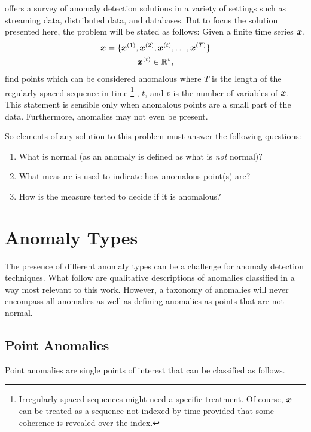 \cite{Gupta2013} offers a survey of anomaly detection solutions in a variety of settings such as streaming data, distributed data, and databases. But to focus the solution presented here, the problem will be stated as follows: Given a finite time series
 $\boldsymbol{x}$,
%
\begin{gather*}
\boldsymbol{x}=\{\boldsymbol{x}\sp{(1)},\boldsymbol{x}\sp{(2)},\boldsymbol{x}\sp{(t)},\ldots,\boldsymbol{x}\sp{(T)}\} \\
\boldsymbol{x}\sp{(t)} \in \mathbb{R}^v
,
\end{gather*}%
%
find points which can be considered anomalous where $T$ is the length of the regularly spaced sequence in time%
\footnote{Irregularly-spaced sequences might need a specific treatment. Of course, $\boldsymbol{x}$ can be treated as a sequence not indexed by time provided that some coherence is revealed over the index.}%
, $t$, and $v$ is the number of variables of $\boldsymbol{x}$. This statement is sensible only when anomalous points are a small part of the data. Furthermore, anomalies may not even be present.

So elements of any solution to this problem must answer the following questions:

\begin{enumerate}
\item
What is normal (as an anomaly is defined as what is \textit{not} normal)?
\item
What measure is used to indicate how anomalous point(s) are?
\item
How is the measure tested to decide if it is anomalous?
\end{enumerate}



\section{Anomaly Types}
\label{sec:anomalytypes}

The presence of different anomaly types can be a challenge for anomaly detection techniques. What follow are qualitative descriptions of anomalies classified in a way most relevant to this work. However, a taxonomy of anomalies will never encompass all anomalies as well as defining anomalies as points that are not normal.

\subsection{Point Anomalies}

Point anomalies are single points of interest that can be classified as follows.

